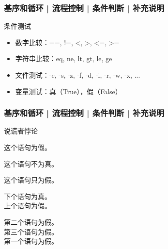 \begin{frame}[fragile]
  \frametitle{基序和循环 | 流程控制 | 条件判断 | \alert{补充说明}}
  \begin{block}{条件测试}
    \begin{itemize}
      \item 数字比较：==, !=, <, >, <=, >=
      \item 字符串比较：eq, ne, lt, gt, le, ge
      \item 文件测试：-e, -s, -z, -f, -d, -l, -r, -w, -x, ...
      \item 变量测试：真（True），假（False）
    \end{itemize}
  \end{block}
\end{frame}

\begin{frame}[fragile]
  \frametitle{基序和循环 | 流程控制 | 条件判断 | 补充说明}
  \begin{block}{说谎者悖论}
    \begin{block}{}
      这个语句为假。
    \end{block}
    \begin{block}{}
      这个语句不为真。
    \end{block}
    \begin{block}{}
      这个语句只为假。
    \end{block}
    \begin{block}{}
    下个语句为真。\\
    上个语句为假。
    \end{block}
    \begin{block}{}
    第二个语句为假。\\
    第三个语句为假。\\
    第一个语句为假。
    \end{block}
  \end{block}
\end{frame}

